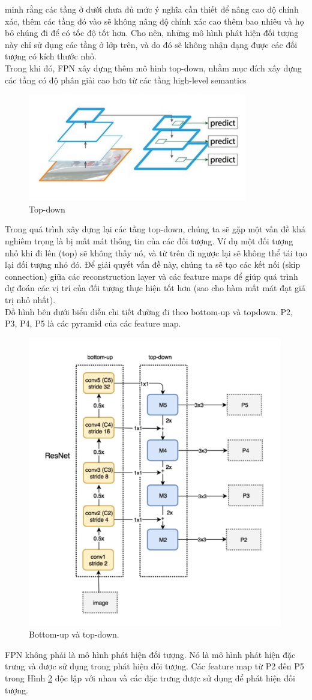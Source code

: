 \documentclass[a4paper, 12pt]{report}
\begin{document}
minh rằng các tầng ở dưới chưa đủ mức ý nghĩa cần thiết để nâng cao độ
chính xác, thêm các tầng đó vào sẽ không nâng độ chính xác cao thêm bao
nhiêu và họ bỏ chúng đi để có tốc độ tốt hơn. Cho nên, những mô hình phát hiện đối tượng này chỉ sử dụng các tầng ở lớp trên, và do đó sẽ không nhận
dạng được các đối tượng có kích thước nhỏ. \\
\hspace*{1cm}Trong khi đó, FPN xây dựng thêm mô hình top-down, nhằm mục đích
xây dựng các tầng có độ phân giải cao hơn từ các tầng high-level semantics \\
\begin{figure}[!h]
	\centering
	\includegraphics[width=0.5\linewidth]{Images/fpn3}
	\caption{Top-down}
	\label{fig:resnet-fpn3}
\end{figure}
\hspace*{1cm}Trong quá trình xây dựng lại các tầng top-down, chúng ta sẽ gặp một
vấn đề khá nghiêm trọng là bị mất mát thông tin của các đối tượng. Ví dụ
một đối tượng nhỏ khi đi lên (top) sẽ không thấy nó, và từ trên đi ngược
lại sẽ không thể tái tạo lại đối tượng nhỏ đó. Để giải quyết vấn đề này,
chúng ta sẽ tạo các kết nối (skip connection) giữa các reconstruction layer
và các feature maps để giúp quá trình dự đoán các vị trí của đối tượng
thực hiện tốt hơn (sao cho hàm mất mát đạt giá trị nhỏ nhất).  \\
\hspace*{1cm}Đồ hình bên dưới biểu diễn chi tiết đường đi theo bottom-up và topdown. P2, P3, P4, P5 là các pyramid của các feature map. \\
\begin{figure}[!h]
	\centering
	\includegraphics[width=0.5\linewidth]{Images/fpn4}
	\caption{Bottom-up và top-down.}
	\label{fig:resnet-fpn4}
\end{figure}
\hspace*{1cm}FPN không phải là mô hình phát hiện đối tượng. Nó là mô hình phát
hiện đặc trưng và được sử dụng trong phát hiện đối tượng. Các feature
map từ P2 đến P5 trong Hình \ref{fig:resnet-fpn4} độc lập với nhau và các đặc trưng
được sử dụng để phát hiện đối tượng.
\end{document}
